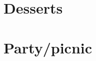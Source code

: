 \documentclass[%
titlepage,
b5paper,
twoside,
11pt
]{book}
\begin{document}
\chapter{Desserts}

\newpage

\newpage

\newpage

\newpage

\newpage

\newpage

\newpage

\newpage


\chapter{Party/picnic}


\newpage

\newpage

\newpage

\newpage

\newpage
\end{document}
